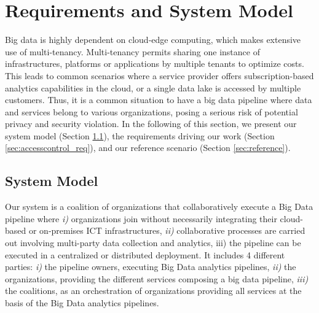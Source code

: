 \section{Requirements and System Model}\label{sec:requirements}
Big data is highly dependent on cloud-edge computing, which makes extensive use of multi-tenancy. Multi-tenancy permits sharing one instance of infrastructures, platforms or applications by multiple tenants to optimize costs. This leads to common scenarios where a service provider offers subscription-based analytics capabilities in the cloud, or a single data lake is accessed by multiple customers. Thus, it is a common situation to have a big data pipeline where data and services belong to various organizations, posing a serious risk of potential privacy and security violation. In the following of this section, we present our system model (Section \ref{sec:systemmodel}), the requirements driving our work (Section \ref{sec:accesscontrol_req}), and our reference scenario (Section \ref{sec:reference}).

\subsection{System Model}\label{sec:systemmodel}
Our system is a coalition of organizations that collaboratively execute a Big Data pipeline where \emph{i)} organizations join without necessarily integrating their cloud-based or on-premises ICT infrastructures, \emph{ii)} collaborative processes are carried out involving multi-party data collection and analytics, iii) the pipeline can be executed in a centralized or distributed deployment.
It includes 4 different parties: \emph{i)} the pipeline owners, executing Big Data analytics pipelines, \emph{ii)} the organizations, providing the different services composing a big data pipeline, \emph{iii)} the coalitions, as an orchestration of organizations providing all services at the basis of the Big Data analytics pipelines.


